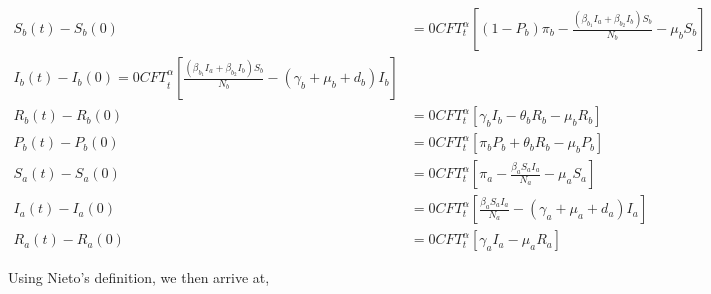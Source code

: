 \documentclass[10pt]{NSP1}
\begin{document}
\begin{equation}
\begin{aligned}
S_{b}(t) - S_{b}(0) &= {0CFT}_{t}^{\alpha}\left\lbrack \left( 1 - P_{b} \right)\pi_{b} - \frac{\left( \beta_{b_{1}}I_{a} + \beta_{b_{2}}I_{b} \right)S_{b}}{N_{b}} - \mu_{b}S_{b} \right\rbrack \\
{I_{b}(t) - I_{b}(0) = 0CFT}_{t}^{\alpha}\left\lbrack \frac{\left( \beta_{b_{1}}I_{a} + \beta_{b_{2}}I_{b} \right)S_{b}}{N_{b}} - \left( \gamma_{b} + \mu_{b} + d_{b} \right)I_{b} \right\rbrack \\
R_{b}(t) - R_{b}(0) &= {0CFT}_{t}^{\alpha}\left\lbrack \gamma_{b}I_{b} - \theta_{b}R_{b} - \mu_{b}R_{b} \right\rbrack \\
P_{b}(t) - P_{b}(0) &= {0CFT}_{t}^{\alpha}\left\lbrack \pi_{b}P_{b} + \theta_{b}R_{b} - \mu_{b}P_{b} \right\rbrack \\
S_{a}(t) - S_{a}(0) &= {0CFT}_{t}^{\alpha}\left\lbrack \pi_{a} - \frac{\beta_{a}S_{a}I_{a}}{N_{a}} - \mu_{a}S_{a} \right\rbrack \\
I_{a}(t) - I_{a}(0) &= {0CFT}_{t}^{\alpha}\left\lbrack \frac{\beta_{a}S_{a}I_{a}}{N_{a}} - \left( \gamma_{a} + \mu_{a} + d_{a} \right)I_{a} \right\rbrack \\
R_{a}(t) - R_{a}(0) &= {0CFT}_{t}^{\alpha}\left\lbrack \gamma_{a}I_{a} - \mu_{a}R_{a} \right\rbrack
\end{aligned}
\end{equation}

Using Nieto's definition, we then arrive at,
\end{document}
